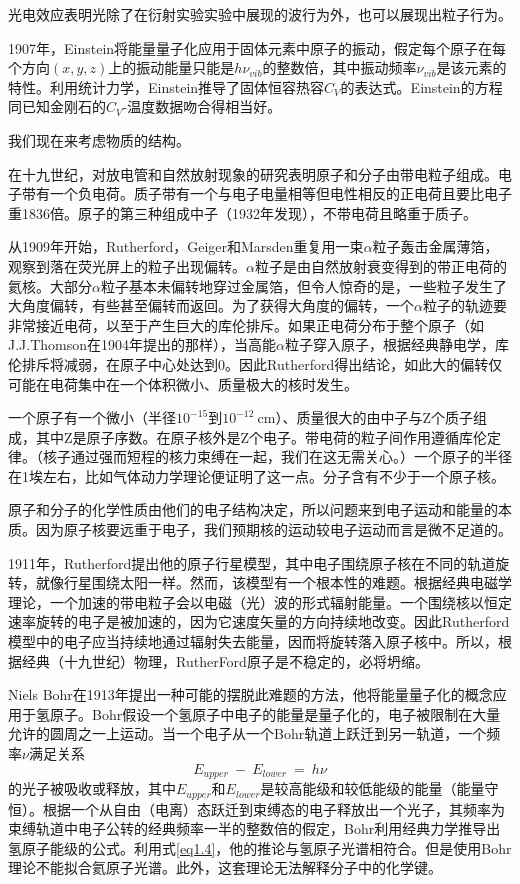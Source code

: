 \documentclass[12pt,a4paper,openany]{ctexbook}
\begin{document}
\begin{flushleft}
光电效应表明光除了在衍射实验实验中展现的波行为外，也可以展现出粒子行为。

1907年，Einstein将能量量子化应用于固体元素中原子的振动，假定每个原子在每个方向$(x,y,z)$上的振动能量只能是$h\nu_{vib}$的整数倍，其中振动频率$\nu_{vib}$是该元素的特性。利用统计力学，Einstein推导了固体恒容热容$C_V$的表达式。Einstein的方程同已知金刚石的$C_V$-温度数据吻合得相当好。

我们现在来考虑物质的结构。

在十九世纪，对放电管和自然放射现象的研究表明原子和分子由带电粒子组成。电子带有一个负电荷。质子带有一个与电子电量相等但电性相反的正电荷且要比电子重1836倍。原子的第三种组成中子（1932年发现），不带电荷且略重于质子。

从1909年开始，Rutherford，Geiger和Marsden重复用一束$\alpha$粒子轰击金属薄箔，观察到落在荧光屏上的粒子出现偏转。$\alpha$粒子是由自然放射衰变得到的带正电荷的氦核。大部分$\alpha$粒子基本未偏转地穿过金属箔，但令人惊奇的是，一些粒子发生了大角度偏转，有些甚至偏转而返回。为了获得大角度的偏转，一个$\alpha$粒子的轨迹要非常接近电荷，以至于产生巨大的库伦排斥。如果正电荷分布于整个原子（如J.J.Thomson在1904年提出的那样），当高能$\alpha$粒子穿入原子，根据经典静电学，库伦排斥将减弱，在原子中心处达到0。因此Rutherford得出结论，如此大的偏转仅可能在电荷集中在一个体积微小、质量极大的核时发生。

一个原子有一个微小（半径$10^{-15}$到$10^{-12}\ $cm）、质量很大的由中子与Z个质子组成，其中Z是原子序数。在原子核外是Z个电子。带电荷的粒子间作用遵循库伦定律。（核子通过强而短程的核力束缚在一起，我们在这无需关心。）一个原子的半径在1埃左右，比如气体动力学理论便证明了这一点。分子含有不少于一个原子核。

原子和分子的化学性质由他们的电子结构决定，所以问题来到电子运动和能量的本质。因为原子核要远重于电子，我们预期核的运动较电子运动而言是微不足道的。

1911年，Rutherford提出他的原子行星模型，其中电子围绕原子核在不同的轨道旋转，就像行星围绕太阳一样。然而，该模型有一个根本性的难题。根据经典电磁学理论，一个加速的带电粒子会以电磁（光）波的形式辐射能量。一个围绕核以恒定速率旋转的电子是被加速的，因为它速度矢量的方向持续地改变。因此Rutherford模型中的电子应当持续地通过辐射失去能量，因而将旋转落入原子核中。所以，根据经典（十九世纪）物理，RutherFord原子是不稳定的，必将坍缩。

Niels Bohr在1913年提出一种可能的摆脱此难题的方法，他将能量量子化的概念应用于氢原子。Bohr假设一个氢原子中电子的能量是量子化的，电子被限制在大量允许的圆周之一上运动。当一个电子从一个Bohr轨道上跃迁到另一轨道，一个频率$\nu$满足关系
\begin{equation}
\boxed{E_{upper}\ -\ E_{lower}\ =\ h\nu}
\label{eq1.4}
\end{equation}
的光子被吸收或释放，其中$E_{upper}\text{和}E_{lower}$是较高能级和较低能级的能量（能量守恒）。根据一个从自由（电离）态跃迁到束缚态的电子释放出一个光子，其频率为束缚轨道中电子公转的经典频率一半的整数倍的假定，Bohr利用经典力学推导出氢原子能级的公式。利用式\eqref{eq1.4}，他的推论与氢原子光谱相符合。但是使用Bohr理论不能拟合氦原子光谱。此外，这套理论无法解释分子中的化学键。


\end{flushleft}
\end{document}
